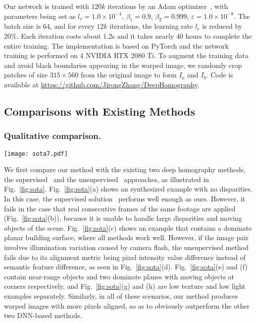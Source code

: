 \documentclass[runningheads]{llncs}
\begin{document}
Our network is trained with $120k$ iterations by an Adam optimizer~\cite{kingma2014adam}, with parameters being set as $l_r = 1.0\times 10^{-4}$, $\beta_1 = 0.9$, $\beta_2 = 0.999$, $\varepsilon = 1.0\times 10^{-8}$. The batch size is $64$, and for every $12k$ iterations, the learning rate $l_r$ is reduced by 20\%. Each iteration costs about $1.2$s and it takes nearly $40$ hours to complete the entire training. The implementation is based on PyTorch and the network training is performed on $4$ NVIDIA RTX 2080 Ti. To augment the training data and avoid black boundaries appearing in the warped image, we randomly crop patches of size $315\times560$ from the original image to form $I_a$ and $I_b$. Code is available at \url{https://github.com/JirongZhang/DeepHomography}.\subsection{Comparisons with Existing Methods}\subsubsection{Qualitative comparison.}

\begin{figure*}[p]
  \centering
  \texttt{[image: sota7.pdf]}
\caption{Comparison with existing DNN-based approaches. Column 1 shows the input and GT target images, columns 2 to 4 are results by the supervised~\cite{detone2016deep}, the unsupervised~\cite{nguyen2018unsupervised} and our method. The errors by all the DNN-based methods are displayed by a bar chart at the bottom.
  }\label{fig:sota}
\end{figure*}

We first compare our method with the existing two deep homography methods, the supervised~\cite{detone2016deep} and the unsupervised~\cite{nguyen2018unsupervised} approaches, as illustrated in Fig.~\ref{fig:sota}. Fig.~\ref{fig:sota}(a) shows an synthesized example with no disparities. In this case, the supervised solution~\cite{detone2016deep} performs well enough as ours. However, it fails in the case that real consecutive frames of the same footage are applied (Fig.~\ref{fig:sota}(b)), because it is unable to handle large disparities and moving objects of the scene. Fig.~\ref{fig:sota}(c) shows an example that contains a dominate planar building surface, where all methods work well. However, if the image pair involves illumination variation caused by camera flash, the unsupervised method~\cite{nguyen2018unsupervised} fails due to its alignment metric being pixel intensity value difference instead of semantic feature difference, as seen in Fig.~\ref{fig:sota}(d). Fig.~\ref{fig:sota}(e) and (f) contain near-range objects and two dominate planes with moving objects at corners respectively, and Fig.~\ref{fig:sota}(g) and (h) are low texture and low light examples separately. Similarly, in all of these scenarios, our method produces warped images with more pixels aligned, so as to obviously outperform the other two DNN-based methods.
\end{document}
